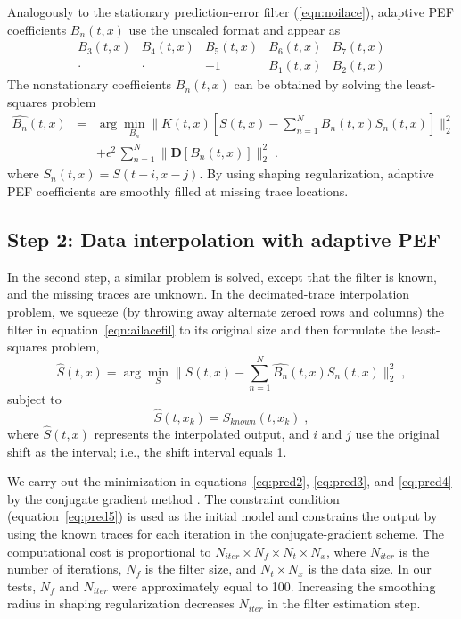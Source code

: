 Analogously to the stationary prediction-error filter
(\ref{eqn:noilace}), adaptive PEF coefficients $B_n(t,x)$ use the
unscaled format and appear as
\begin{equation} \begin{array}{ccccc}
B_3(t,x) &B_4(t,x) &B_5(t,x) &B_6(t,x) &B_7(t,x) \\ \cdot &\cdot &-1
&B_1(t,x) &B_2(t,x) \end{array} \label{eqn:npef} \end{equation} The
nonstationary coefficients $B_n(t,x)$ can be obtained by solving the
least-squares problem
\begin{eqnarray}
  \label{eq:pred3}
\widehat{B_n}(t,x) &=& \arg\min_{B_n}\|K(t,x)[S(t,x)-\sum_{n=1}^{N} 
   B_n(t,x)S_n(t,x)]\|_2^2 \nonumber \\
  & & + \epsilon^2\, \sum_{n=1}^{N} \|\mathbf{D}[B_n(t,x)]\|_2^2\;.
\end{eqnarray}
where $S_n(t,x)=S(t-i,x-j)$. By using shaping regularization, 
adaptive PEF coefficients are smoothly filled at missing trace
locations.

\subsection{Step 2: Data interpolation with adaptive PEF}

In the second step, a similar problem is solved, except that the
filter is known, and the missing traces are unknown. In the
decimated-trace interpolation problem, we squeeze (by throwing away
alternate zeroed rows and columns) the filter in
equation~\ref{eqn:ailacefil} to its original size
and then formulate the least-squares problem,
\begin{equation}
  \label{eq:pred4}
     \widehat{S}(t,x) = \arg\min_{S}\|S(t,x)-\sum_{n=1}^{N} 
       \widehat{B_n}(t,x)S_n(t,x)\|_2^2\;,
\end{equation}
subject to
\begin{equation}
  \label{eq:pred5}
      \widehat{S}(t,x_k) = S_{known}(t,x_k)\;,
\end{equation}
where $\widehat{S}(t,x)$ represents the interpolated output, and $i$
and $j$ use the original shift as the interval; i.e., the shift
interval equals 1.

We carry out the minimization in
equations~\ref{eq:pred2}, \ref{eq:pred3}, and \ref{eq:pred4} by the
conjugate gradient method \cite[]{Hestenes52}. The constraint
condition (equation~\ref{eq:pred5}) is used as the initial model and
constrains the output by using the known traces for each iteration in
the conjugate-gradient scheme. The computational cost is proportional to
$N_{iter}\times N_{f}\times N_{t}\times N_{x}$, where $N_{iter}$
is the number of iterations, $N_f$ is the filter size, and $N_t \times
N_x$ is the data size. In our tests, $N_f$ and $N_{iter}$ were
approximately equal to 100. Increasing the smoothing radius in shaping
regularization decreases $N_{iter}$ in the filter estimation step.

